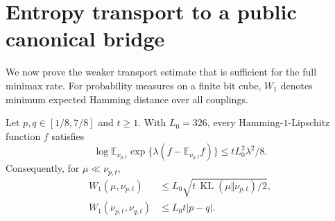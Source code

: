 \section{Entropy transport to a public canonical bridge}
\label{bin:transport}
We now prove the weaker transport estimate that is sufficient for the full minimax rate. For probability measures on a finite bit cube, $W_1$ denotes minimum expected Hamming distance over all couplings.

\begin{lemma}
\label{bin:entropy}
Let $p,q\in[1/8,7/8]$ and $t\ge1$. With $L_0=326$, every Hamming-$1$-Lipschitz function $f$ satisfies
\begin{equation}
 \log\mathbb E_{\nu_{p,t}}
       \exp\{\lambda(f-\mathbb E_{\nu_{p,t}}f)\}
       \le tL_0^2\lambda^2/8.
 \label{bin:mgf}
\end{equation}
Consequently, for $\mu\ll\nu_{p,t}$,
\begin{align}
 W_1(\mu,\nu_{p,t})&\le L_0\sqrt{t\,\operatorname{KL}(\mu\Vert\nu_{p,t})/2},
 \label{bin:transportentropy}\\
 W_1(\nu_{p,t},\nu_{q,t})&\le L_0t|p-q|.
 \label{bin:transportparameter}
\end{align}
\end{lemma}
